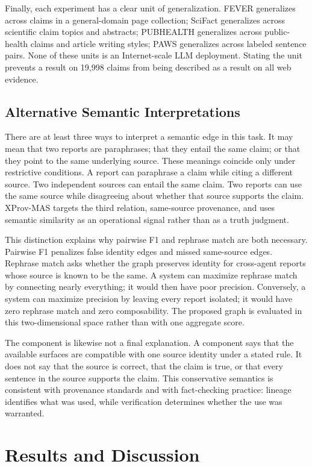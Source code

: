 \documentclass{ieeeaccess}
\begin{document}
Finally, each experiment has a clear unit of generalization. FEVER generalizes across claims in a general-domain page collection; SciFact generalizes across scientific claim topics and abstracts; PUBHEALTH generalizes across public-health claims and article writing styles; PAWS generalizes across labeled sentence pairs. None of these units is an Internet-scale LLM deployment. Stating the unit prevents a result on 19,998 claims from being described as a result on all web evidence.

\subsection{Alternative Semantic Interpretations}
There are at least three ways to interpret a semantic edge in this task. It may mean that two reports are paraphrases; that they entail the same claim; or that they point to the same underlying source. These meanings coincide only under restrictive conditions. A report can paraphrase a claim while citing a different source. Two independent sources can entail the same claim. Two reports can use the same source while disagreeing about whether that source supports the claim. XProv-MAS targets the third relation, same-source provenance, and uses semantic similarity as an operational signal rather than as a truth judgment.

This distinction explains why pairwise F1 and rephrase match are both necessary. Pairwise F1 penalizes false identity edges and missed same-source edges. Rephrase match asks whether the graph preserves identity for cross-agent reports whose source is known to be the same. A system can maximize rephrase match by connecting nearly everything; it would then have poor precision. Conversely, a system can maximize precision by leaving every report isolated; it would have zero rephrase match and zero composability. The proposed graph is evaluated in this two-dimensional space rather than with one aggregate score.

The component is likewise not a final explanation. A component says that the available surfaces are compatible with one source identity under a stated rule. It does not say that the source is correct, that the claim is true, or that every sentence in the source supports the claim. This conservative semantics is consistent with provenance standards and with fact-checking practice: lineage identifies what was used, while verification determines whether the use was warranted.

\section{Results and Discussion}
\end{document}
